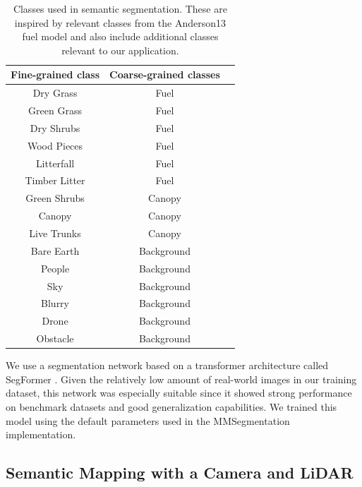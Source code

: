 \begin{table}[ht!]
    \centering
\begin{tabular}{ccc}
\toprule
\textbf{Fine-grained class} & \textbf{Coarse-grained classes} \\ \midrule
Dry Grass          &  Fuel \\
Green Grass        &  Fuel \\
Dry Shrubs         &  Fuel \\
Wood Pieces        &  Fuel \\
Litterfall         &  Fuel \\
Timber Litter      &  Fuel \\
Green Shrubs       &  Canopy \\
Canopy             &  Canopy \\
Live Trunks        &  Canopy \\
Bare Earth         &  Background \\
People             &  Background \\
Sky                &  Background \\
Blurry             &  Background \\
Drone              &  Background \\
Obstacle           &  Background \\
\bottomrule
\end{tabular}
\caption{Classes used in semantic segmentation. These are inspired by relevant classes from the Anderson13 fuel model \cite{anderson1981aids} and also include additional classes relevant to our application.}
\label{table:methods:fuel_classes}
\end{table}

We use a segmentation network based on a transformer architecture called SegFormer \cite{Xie2021}. Given the relatively low amount of real-world images in our training dataset, this network was especially suitable since it showed strong performance on benchmark datasets and good generalization capabilities. We trained this model using the default parameters used in the MMSegmentation \cite{mmseg2020} implementation. 


\subsection{Semantic Mapping with a Camera and LiDAR}

